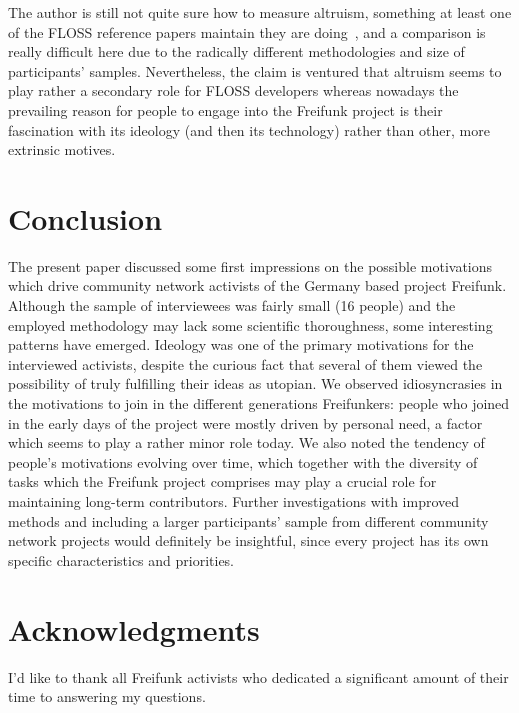 \documentclass{scrartcl}
\begin{document}
The author is still not quite sure how to measure altruism, something at least one of the FLOSS reference papers maintain they are doing~\cite{HarOu2002}, and a comparison is really difficult here due to the radically different methodologies and size of participants' samples.
Nevertheless, the claim is ventured that altruism seems to play rather a secondary role for FLOSS developers whereas nowadays the prevailing reason for people to engage into the Freifunk project is their fascination with its ideology (and then its technology) rather than other, more extrinsic motives.

\section{Conclusion}

The present paper discussed some first impressions on the possible motivations which drive community network activists of the Germany based project Freifunk.
Although the sample of interviewees was fairly small (16 people) and the employed methodology may lack some scientific thoroughness, some interesting patterns have emerged.
Ideology was one of the primary motivations for the interviewed activists, despite the curious fact that several of them viewed the possibility of truly fulfilling their ideas as utopian.
We observed idiosyncrasies in the motivations to join in the different generations Freifunkers:
people who joined in the early days of the project were mostly driven by personal need, a factor which seems to play a rather minor role today.
We also noted the tendency of people's motivations evolving over time,
which together with the diversity of tasks which the Freifunk project comprises may play a crucial role for maintaining long-term contributors.
Further investigations with improved methods and including a larger participants' sample from different community network projects would definitely be insightful, since every project has its own specific characteristics and priorities.


\section{Acknowledgments}
I'd like to thank all Freifunk activists who dedicated a significant amount of their time to answering my questions.
\end{document}
